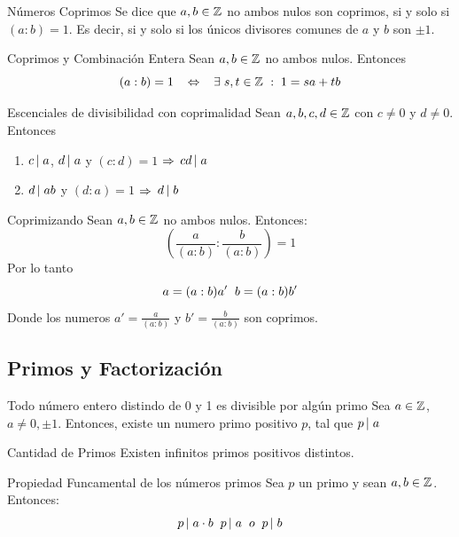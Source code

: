 \documentclass[10pt]{article}
\begin{document}
\begin{defi}{Números Coprimos}
 Se dice que $a,b \in \entero{}$ no ambos nulos son coprimos, si y solo si $(a:b)=1$. Es decir, si y solo si los únicos divisores comunes de $a$ y $b$ son $\pm 1$.
\end{defi}

\begin{obs}{Coprimos y Combinación Entera}
 Sean $a,b \in \entero{}$ no ambos nulos. Entonces
 \[ (a:b)=1 \es{0.3} \sii \es{0.3} \exists \es{0.1} s,t \in \entero{}\es{0.1} :\es{0.1} 1 = s a + t b\]
\end{obs}

\begin{prop}{Escenciales de divisibilidad con coprimalidad}
Sean $a,b,c,d \in \entero{}$ con $c \neq 0$ y $d \neq 0$. Entonces
 
\begin{enumerate}
 \item $\divi{c}{a}$, $\divi{d}{a}$ y $(c:d)=1$ $\implica$ $\divi{c d}{a}$
 \item $\divi{d}{a b}$ y $(d:a)=1$ $\implica$ $\divi{d}{b}$
\end{enumerate}
\end{prop}

\begin{propo}{Coprimizando}
 Sean $a,b \in \entero{}$ no ambos nulos. Entonces:
 \[\left(\frac{a}{(a:b)} : \frac{b}{(a:b)}\right) = 1\]
 Por lo tanto
 \[a = (a:b)a' \es{0.2} b = (a:b)b'\]
 Donde los numeros $a' = \frac{a}{(a:b)}$ y $b' = \frac{b}{(a:b)}$ son coprimos.
\end{propo}

\begin{center}
\subsection{Primos y Factorización}   
\end{center}

\begin{propo}{Todo número entero distindo de 0 y  1 es divisible por algún primo}
 Sea $a \in \entero{}$, $a \neq 0, \pm 1$. Entonces, existe un numero primo positivo $p$, tal que $\divi{p}{a}$
\end{propo}

\begin{cor}{Cantidad de Primos}
Existen infinitos primos positivos distintos.
\end{cor}

\begin{teo}{Propiedad Funcamental de los números primos}
 Sea $p$ un primo y sean $a,b \in \entero{}$. Entonces:
 \[\divi{p}{a \cdot b} \es{0.2} \divi{p}{a} \es{0.2} o \es{0.2} \divi{p}{b}\]
\end{teo}
\end{document}

